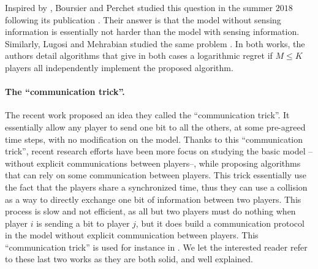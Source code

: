 Inspired by \cite{Besson2018ALT},
Boursier and Perchet studied this question in the summer $2018$ following its publication \cite{BoursierPerchet18}.
Their answer is that the model without sensing information is essentially not harder than the model with sensing information.
%
Similarly, Lugosi and Mehrabian studied the same problem \cite{LugosiMehrabian18}.
In both works, the authors detail algorithms that give in both cases a logarithmic regret if $M \leq K$ players all independently implement the proposed algorithm.


\paragraph{The ``communication trick''.}
%

The recent work \cite{BoursierPerchet18} proposed an idea they called the ``communication trick''.
It essentially allow any player to send one bit to all the others, at some pre-agreed time steps, with no modification on the model.
Thanks to this ``communication trick'', recent research efforts have been more focus on studying the basic model --without explicit communications between players--, while proposing algorithms that can rely on some communication between players.
This trick essentially use the fact that the players share a synchronized time, thus they can use a collision as a way to directly exchange one bit of information between two players.
This process is slow and not efficient, as all but two players must do nothing when player $i$ is sending a bit to player $j$, but it does build a communication protocol in the model without explicit communication between players.
This ``communication trick'' is used for instance in \cite{KaufmannAbbas19}.
We let the interested reader refer to these last two works \cite{BoursierPerchet18,KaufmannAbbas19} as they are both solid, and well explained.


